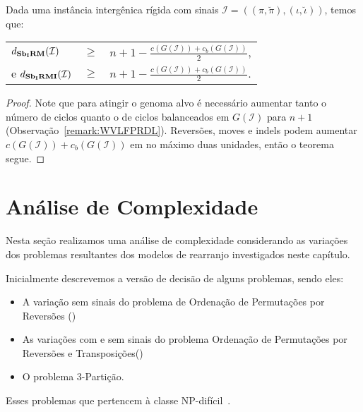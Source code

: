 \begin{theorem}\label{theorem:OCNPWYNL}
Dada uma instância intergênica rígida com sinais $\mathcal{I}=((\pi,\breve\pi),(\iota,\breve\iota))$, temos que:

\begin{tabular}{lll}
  $d_{\textbf{Sb\textsubscript{I}RM}}(\mathcal{I})$     & $ \ge $ & ${n + 1} - \frac{c(G(\mathcal{I})) + c_b(G(\mathcal{I}))}{2}$, \\
  e $d_{\textbf{Sb\textsubscript{I}RMI}}(\mathcal{I})$    & $ \ge $ & ${n + 1} - \frac{c(G(\mathcal{I})) + c_b(G(\mathcal{I}))}{2}$. \\
\end{tabular}
\end{theorem}
\begin{proof}
Note que para atingir o genoma alvo é necessário aumentar tanto o número de ciclos quanto o de ciclos balanceados em $G(\mathcal{I})$ para $n+1$ (Observação~\ref{remark:WVLFPRDL}). Reversões, moves e indels podem aumentar $c(G(\mathcal{I})) + c_b(G(\mathcal{I}))$ em no máximo duas unidades, então o teorema segue.
\end{proof}

\section{Análise de Complexidade}

Nesta seção realizamos uma análise de complexidade considerando as variações dos problemas resultantes dos modelos de rearranjo investigados neste capítulo.

Inicialmente descrevemos a versão de decisão de alguns problemas, sendo eles:
\begin{itemize}
  \item A variação sem sinais do problema de Ordenação de Permutações por Reversões (\SbR)
  \item As variações com e sem sinais do problema Ordenação de Permutações por Reversões e Transposições(\SbRT)
  \item O problema $3$-Partição.
\end{itemize}
Esses problemas que pertencem à classe NP-difícil~\cite{1999-caprara,2019b-oliveira-etal,1990-garey-johnson}.

\begin{decision}
\end{decision}

